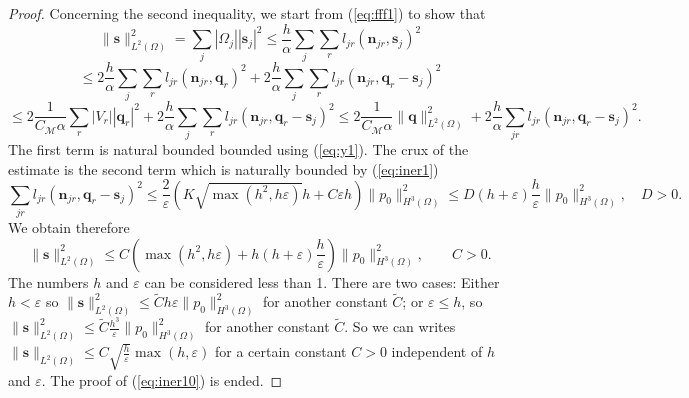 \documentclass[a4paper,french,english,10pt]{article}
\newcommand\njr{\mathbf{n}_{jr}}
\newcommand\eps{\varepsilon}
\begin{document}
\begin{proof}
Concerning the second inequality, we start from  (\ref{eq:fff1})  to show that 
$$
\|\mathbf s\|_{L^2(\Omega)}^2=
\sum_j | \Omega_j | |\mathbf s_j |^2\leq \frac h\alpha  \sum_{j}\sum_r  
 l_{jr}
\left( \njr,  \mathbf s_j  \right)^2
$$
$$
\leq 2 \frac h\alpha  \sum_{j}\sum_r  
 l_{jr}
\left( \njr,  \mathbf q_r   \right)^2
+
2 \frac h\alpha  \sum_{j}\sum_r  
 l_{jr}
\left( \njr,  \mathbf q_r  -\mathbf s_j  \right)^2
$$
$$
\leq 2 \frac 1 {C_\mathcal M  \alpha}  \sum_r  
 | V_r| 
\left|   \mathbf q_r   \right|^2 + 2 \frac h\alpha  \sum_{j}\sum_r  
 l_{jr}
\left( \njr,  \mathbf q_r  -\mathbf s_j  \right)^2
\leq 
2\frac 1 {C_\mathcal M  \alpha} \|\mathbf q\|_{L^2(\Omega)}^2+ 
2 \frac h\alpha  \sum_{jr} l_{jr}
\left( \njr, \mathbf q_r - \mathbf s_j  \right)^2.
$$
The first term is natural bounded   bounded using (\ref{eq:y1}).
The crux of the estimate is the second term which is naturally bounded by  (\ref{eq:iner1})
$$
 \sum_{jr} l_{jr}
\left( \njr, \mathbf q_r - \mathbf s_j  \right)^2 \leq \frac 2 \varepsilon
\left(K   \sqrt{\max(h^2, h\eps)  } h  + C  \varepsilon h 
\right)\| p _0\|_{H^3(\Omega)}  ^2 
\leq D (h+\varepsilon) \frac h \varepsilon \| p _0\|_{H^3(\Omega)}  ^2,
\quad D>0.
$$
 We obtain 
therefore
$$
\|\mathbf s\|_{L^2(\Omega)}^2
\leq C \left(   { \max(h^2 , h \eps  )}
+h  (h+\varepsilon) \frac{h}\eps
 \right) \| p _0\|_{H^3(\Omega)}  ^2, \qquad C>0.
$$
The numbers  $h$ and $\eps$ can be considered less than 1.
There are two cases:
 Either $h<\eps$  so
$
\|\mathbf s\|_{L^2(\Omega)}^2
\leq \widetilde C  h\eps    \| p _0\|_{H^3(\Omega)}  ^2
$ for another constant $\widetilde C$;
or $\eps\leq h$, so 
$
\|\mathbf s\|_{L^2(\Omega)}^2
\leq \widetilde C \frac{h^3}\eps \| p _0\|_{H^3(\Omega)}  ^2$
 for another constant $\widetilde C$.
So we can writes
$
\|\mathbf s\|_{L^2(\Omega)}
\leq C \sqrt{ \frac{h}\eps} \max(  h, \eps)$ for a certain constant $ C>0$ independent of $h$ and $\varepsilon$.
The proof of (\ref{eq:iner10}) is ended.
\end{proof}
\end{document}
